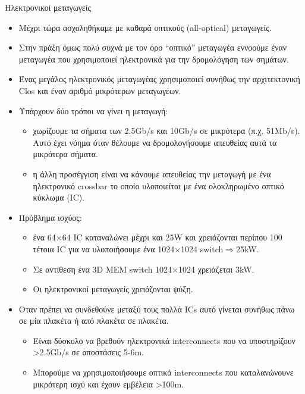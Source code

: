 \documentclass[11pt,aspectratio=169]{beamer}
\begin{document}
\begin{frame}[shrink=20,t]{Ηλεκτρονικοί μεταγωγείς}
\begin{itemize}
\item Μέχρι τώρα ασχοληθήκαμε με καθαρά οπτικούς (all-optical) μεταγωγείς.
\item Στην πράξη όμως πολύ συχνά με τον όρο “οπτικό” μεταγωγέα εννοούμε έναν μεταγωγέα που χρησιμοποιεί ηλεκτρονικά για την δρομολόγηση των σημάτων.
\item Ένας μεγάλος ηλεκτρονικός μεταγωγέας χρησιμοποιεί συνήθως την αρχιτεκτονική Clos και έναν αριθμό μικρότερων μεταγωγέων.
\item Υπάρχουν δύο τρόποι να γίνει η μεταγωγή:
\begin{itemize}
\item χωρίζουμε τα σήματα των 2.5Gb/s και 10Gb/s σε μικρότερα (π.χ. 51Mb/s). Αυτό έχει νόημα όταν θέλουμε να δρομολογήσουμε απευθείας αυτά τα μικρότερα σήματα.
\item η άλλη προσέγγιση είναι να κάνουμε απευθείας την μεταγωγή με ένα ηλεκτρονικό crossbar το οποίο υλοποιείται με ένα ολοκληρωμένο οπτικό κύκλωμα (IC).
\end{itemize}
\item Πρόβλημα ισχύος:
\begin{itemize}
\item ένα 64\ensuremath{\times}64 IC καταναλώνει μέχρι και 25W και χρειάζονται περίπου 100 τέτοια IC για να υλοποιήσουμε ένα 1024\ensuremath{\times}1024 switch\ensuremath{\Rightarrow}25kW.
\item Σε αντίθεση ένα 3D MEM switch 1024\ensuremath{\times}1024 χρειάζεται 3kW.
\item Οι ηλεκτρονικοί μεταγωγείς χρειάζονται ψύξη.
\end{itemize}
\item Oταν πρέπει να συνδεθούνε μεταξύ τους πολλά ICs αυτό γίνεται συνήθως πάνω σε μία πλακέτα ή από πλακέτα σε πλακέτα.
\begin{itemize}
\item Είναι δύσκολο να βρεθούν ηλεκτρονικά interconnects που να υποστηρίζουν >2.5Gb/s σε αποστάσεις 5-6m.
\item Mπορούμε να χρησιμοποιήσουμε οπτικά interconnects που καταλανώνουνε μικρότερη ισχύ και έχουν εμβέλεια >100m.
\end{itemize}
\end{itemize}
\end{frame}
\end{document}

